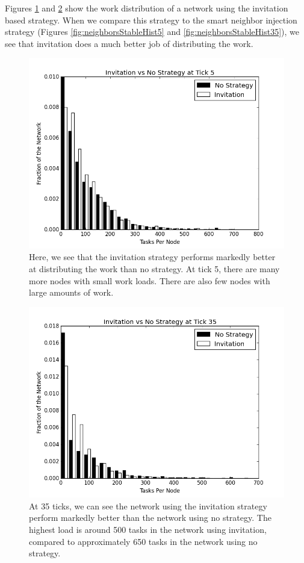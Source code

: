 \documentclass[11pt,letterpaper]{article}
\begin{document}
{	
	Figures \ref{fig:inviteStableHist5} and \ref{fig:inviteStableHist35} show the work distribution of a network using the invitation based strategy.
	When we compare this strategy to the smart neighbor injection strategy (Figures \ref{fig:neighborsStableHist5} and \ref{fig:neighborsStableHist35}), we see that invitation does a much better job of distributing the work.
	
	\begin{figure}
		\centering
		\includegraphics[width=0.7\linewidth]{figs/inviteStableHist5}
		\caption[Invitiation vs no strategy after 5 ticks]{Here, we see that the invitation strategy performs markedly better at distributing the work than no strategy.  At tick 5, there are many more nodes with small work loads.  There are also few nodes with large amounts of work.}
		\label{fig:inviteStableHist5}
	\end{figure}
	
	\begin{figure}
		\centering
		\includegraphics[width=0.7\linewidth]{figs/inviteStableHist35}
		\caption[Invitiation vs no strategy after 35 ticks]{At 35 ticks, we can see the network using the invitation strategy perform markedly better than the network using no strategy. The highest load is around 500 tasks in the network using invitation, compared to approximately 650 tasks in the network using no strategy.}
		\label{fig:inviteStableHist35}
	\end{figure}
	
}
\end{document}
